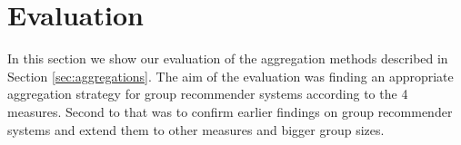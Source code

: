 \section{Evaluation}\label{sec:evaluation}
In this section we show our evaluation of the aggregation methods described in Section \ref{sec:aggregations}. The aim of the evaluation was finding an appropriate aggregation strategy for group recommender systems according to the 4 measures. Second to that was to confirm earlier findings on group recommender systems and extend them to other measures and bigger group sizes.


